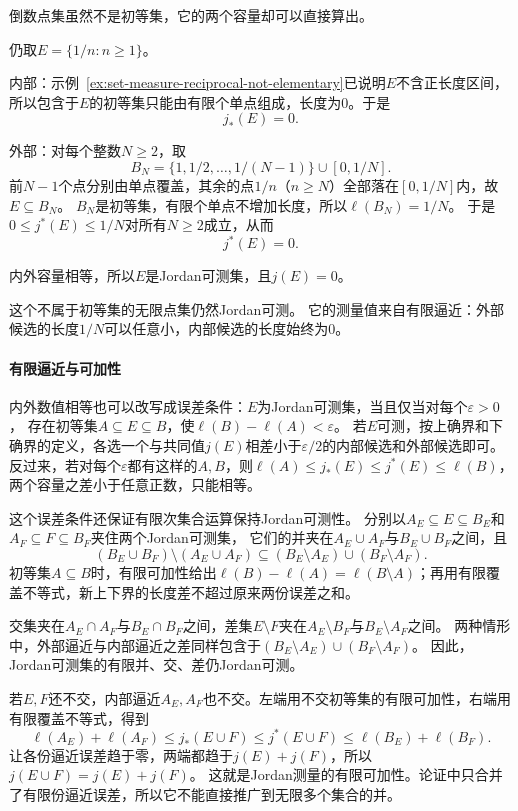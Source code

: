 倒数点集虽然不是初等集，它的两个容量却可以直接算出。
\begin{example}[倒数点集的Jordan测量为零]
\label{ex:set-measure-reciprocal-jordan-null}
仍取$E=\{1/n:n\geq1\}$。

内部：示例~\ref{ex:set-measure-reciprocal-not-elementary}已说明$E$不含正长度区间，所以包含于$E$的初等集只能由有限个单点组成，长度为$0$。于是
\[
 j_*(E)=0.
\]

外部：对每个整数$N\geq2$，取
\[
 B_N=\{1,1/2,\ldots,1/(N-1)\}\cup[0,1/N].
\]
前$N-1$个点分别由单点覆盖，其余的点$1/n$（$n\geq N$）全部落在$[0,1/N]$内，故$E\subseteq B_N$。
$B_N$是初等集，有限个单点不增加长度，所以$\ell(B_N)=1/N$。
于是$0\leq j^*(E)\leq1/N$对所有$N\geq2$成立，从而
\[
 j^*(E)=0.
\]

内外容量相等，所以$E$是Jordan可测集，且$j(E)=0$。
\end{example}

这个不属于初等集的无限点集仍然Jordan可测。
它的测量值来自有限逼近：外部候选的长度$1/N$可以任意小，内部候选的长度始终为$0$。

\paragraph{有限逼近与可加性}

内外数值相等也可以改写成误差条件：$E$为Jordan可测集，当且仅当对每个$\varepsilon>0$，
存在初等集$A\subseteq E\subseteq B$，使$\ell(B)-\ell(A)<\varepsilon$。
若$E$可测，按上确界和下确界的定义，各选一个与共同值$j(E)$相差小于$\varepsilon/2$的内部候选和外部候选即可。
反过来，若对每个$\varepsilon$都有这样的$A,B$，则$\ell(A)\leq j_*(E)\leq j^*(E)\leq\ell(B)$，两个容量之差小于任意正数，只能相等。

这个误差条件还保证有限次集合运算保持Jordan可测性。
分别以$A_E\subseteq E\subseteq B_E$和$A_F\subseteq F\subseteq B_F$夹住两个Jordan可测集，
它们的并夹在$A_E\cup A_F$与$B_E\cup B_F$之间，且
\[
 (B_E\cup B_F)\setminus(A_E\cup A_F)\subseteq(B_E\setminus A_E)\cup(B_F\setminus A_F).
\]
初等集$A\subseteq B$时，有限可加性给出$\ell(B)-\ell(A)=\ell(B\setminus A)$；再用有限覆盖不等式，新上下界的长度差不超过原来两份误差之和。

交集夹在$A_E\cap A_F$与$B_E\cap B_F$之间，差集$E\setminus F$夹在$A_E\setminus B_F$与$B_E\setminus A_F$之间。
两种情形中，外部逼近与内部逼近之差同样包含于$(B_E\setminus A_E)\cup(B_F\setminus A_F)$。
因此，Jordan可测集的有限并、交、差仍Jordan可测。

若$E,F$还不交，内部逼近$A_E,A_F$也不交。左端用不交初等集的有限可加性，右端用有限覆盖不等式，得到
\[
 \ell(A_E)+\ell(A_F)
 \leq j_*(E\cup F)\leq j^*(E\cup F)
 \leq\ell(B_E)+\ell(B_F).
\]
让各份逼近误差趋于零，两端都趋于$j(E)+j(F)$，所以$j(E\cup F)=j(E)+j(F)$。
这就是Jordan测量的有限可加性。论证中只合并了有限份逼近误差，所以它不能直接推广到无限多个集合的并。

